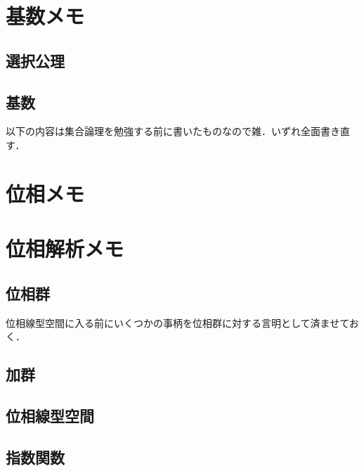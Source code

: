 \documentclass[a4j,10.5pt,oneside,openany]{jsbook}
\theoremstyle{mystyle}
\begin{document}
\chapter{基数メモ}
	\section{選択公理}
		
	\section{基数}
		
		

\newpage	
以下の内容は集合論理を勉強する前に書いたものなので雑．いずれ全面書き直す．
\chapter{位相メモ}
	
	
	
	
	
	
	
	
	

\chapter{位相解析メモ}
	\section{位相群}
		位相線型空間に入る前にいくつかの事柄を位相群に対する言明として済ませておく．
		
		
		
	\section{加群}
		
		
	\section{位相線型空間}
		
		
		
		
		
		
	\section{指数関数}
		
		
		
		
		
\end{document}
